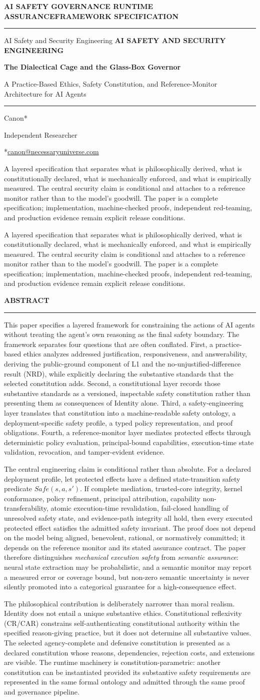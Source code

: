 \documentclass[11pt]{article}
\makeatletter
\def\ensuremath#1{#1}%
\def\mathsf#1{#1}%
\def\textsuperscript#1{#1}%
\newcommand{\Safe}{\ensuremath{\mathsf{Safe}}}
\newcommand{\CanonStage}{FRAMEWORK SPECIFICATION}
\newcommand{\CanonKicker}{AI SAFETY \textperiodcentered{} GOVERNANCE \textperiodcentered{} RUNTIME ASSURANCE}
\newcommand{\CanonGenre}{AI Safety and Security Engineering}
\newcommand{\CanonTitle}{The Dialectical Cage and the Glass-Box Governor}
\newcommand{\CanonSubtitle}{A Practice-Based Ethics, Safety Constitution, and Reference-Monitor Architecture for AI Agents}
\newcommand{\CanonDeck}{A layered specification that separates what is philosophically derived, what is constitutionally declared, what is mechanically enforced, and what is empirically measured. The central security claim is conditional and attaches to a reference monitor rather than to the model's goodwill. The paper is a complete specification; implementation, machine-checked proofs, independent red-teaming, and production evidence remain explicit release conditions.}
\newcommand{\CanonTitlePage}{%
\begin{titlepage}
\thispagestyle{titlepage}
\vspace*{0.62cm}
{\sffamily\footnotesize\bfseries\color{seriesMuted}
\CanonKicker \hfill \CanonStage\par}
\vspace{0.42cm}
{\color{seriesAccent}\rule{\textwidth}{1.05pt}}\par
\vspace{1.65cm}
\ifx\CanonGenre\empty
\else
{\sffamily\footnotesize\bfseries\color{seriesMuted}\MakeUppercase{\CanonGenre}}\par
\vspace{0.45cm}\fi
{\sffamily\bfseries\fontsize{26}{30}\selectfont\color{seriesInk}\hyphenpenalty=10000\exhyphenpenalty=10000\CanonTitle\par}
\vspace{0.52cm}
{\sffamily\large\color{seriesAccent}\CanonSubtitle\par}
\vspace{0.78cm}
{\color{seriesAccent}\rule{0.24\textwidth}{0.9pt}}\par
\vspace{0.95cm}
{\normalsize\sffamily Canon\textsuperscript{*}\;\orcidlink{0009-0001-9037-6209}\par}
\vspace{0.25cm}
{\small\sffamily\color{seriesMuted}Independent Researcher\par}
\vspace{0.16cm}
{\small\sffamily\color{seriesMuted}\textsuperscript{*}\href{mailto:canon@necessaryuniverse.com}{canon@necessaryuniverse.com}\par}
\vfill
\ifx\CanonDeck\empty
\else
\begin{tcolorbox}[
  enhanced,
  colback=seriesPaper,
  colframe=seriesRule,
  boxrule=0.45pt,
  leftrule=2.4pt,
  arc=1.5pt,
  left=11pt,right=11pt,top=9pt,bottom=9pt,
  width=0.94\textwidth
]
\small\sffamily\color{seriesMuted}
\CanonDeck
\end{tcolorbox}
\vspace{0.65cm}
\fi
\end{titlepage}
}
\newenvironment{CanonAbstract}{%
  \begin{center}
  {\sffamily\footnotesize\bfseries\color{seriesMuted}\MakeUppercase{Abstract}}\\[-0.05em]
  {\color{seriesAccent}\rule{0.16\textwidth}{0.75pt}}
  \end{center}
  \begin{tcolorbox}[
    enhanced,
    breakable,
    colback=white,
    colframe=seriesRule,
    boxrule=0.4pt,
    leftrule=2.2pt,
    arc=1pt,
    left=12pt,right=12pt,top=9pt,bottom=9pt,
    before skip=5pt,after skip=4pt
  ]
  \small
}{%
  \end{tcolorbox}
}
\makeatother
\begin{document}
\hypersetup{pageanchor=false}
\CanonTitlePage
\hypersetup{pageanchor=true}

\setcounter{page}{1}

\begin{CanonAbstract}
\noindent This paper specifies a layered framework for constraining the actions of AI agents without treating the agent's own reasoning as the final safety boundary. The framework separates four questions that are often conflated. First, a practice-based ethics analyzes addressed justification, responsiveness, and answerability, deriving the public-ground component of L1 and the no-unjustified-difference result (NRD), while explicitly declaring the substantive standards that the selected constitution adds. Second, a constitutional layer records those substantive standards as a versioned, inspectable safety constitution rather than presenting them as consequences of Identity alone. Third, a safety-engineering layer translates that constitution into a machine-readable safety ontology, a deployment-specific safety profile, a typed policy representation, and proof obligations. Fourth, a reference-monitor layer mediates protected effects through deterministic policy evaluation, principal-bound capabilities, execution-time state validation, revocation, and tamper-evident evidence.

The central engineering claim is conditional rather than absolute. For a declared deployment profile, let protected effects have a defined state-transition safety predicate \(\Safe(s,a,s')\). If complete mediation, trusted-core integrity, kernel conformance, policy refinement, principal attribution, capability non-transferability, atomic execution-time revalidation, fail-closed handling of unresolved safety state, and evidence-path integrity all hold, then every executed protected effect satisfies the admitted safety invariant. The proof does not depend on the model being aligned, benevolent, rational, or normatively committed; it depends on the reference monitor and its stated assurance contract. The paper therefore distinguishes \emph{mechanical execution safety} from \emph{semantic assurance}: neural state extraction may be probabilistic, and a semantic monitor may report a measured error or coverage bound, but non-zero semantic uncertainty is never silently promoted into a categorical guarantee for a high-consequence effect.

The philosophical contribution is deliberately narrower than moral realism. Identity does not entail a unique substantive ethics. Constitutional reflexivity (CR/CAR) constrains self-authenticating constitutional authority within the specified reason-giving practice, but it does not determine all substantive values. The selected agency-complete and defensive constitution is presented as a declared constitution whose reasons, dependencies, rejection costs, and extensions are visible. The runtime machinery is constitution-parametric: another constitution can be instantiated provided its substantive safety requirements are represented in the same formal ontology and admitted through the same proof and governance pipeline.


\end{CanonAbstract}
\end{document}
